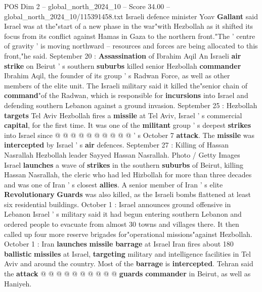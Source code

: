 \begin{textsample}{POS Dim 2 – global\_north\_2024\_10 – Score 34.00 – global\_north\_2024\_10/115391458.txt}
Israeli defence minister Yoav \textbf{Gallant} said Israel was at the"start of a new phase in the war"with Hezbollah as it shifted its focus from its conflict against Hamas in Gaza to the northern front."The ' centre of gravity ' is moving northward -- resources and forces are being allocated to this front,"he said.
September 20 : \textbf{Assassination} of Ibrahim Aqil An Israeli \textbf{air} \textbf{strike} on Beirut ' s southern \textbf{suburbs} killed senior Hezbollah \textbf{commander} Ibrahim Aqil, the founder of its group ' s Radwan Force, as well as other members of the elite unit.
The Israeli military said it killed the"senior chain of \textbf{command}"of the Radwan, which is responsible for \textbf{incursions} into Israel and defending southern Lebanon against a ground invasion.
September 25 : Hezbollah \textbf{targets} Tel Aviv Hezbollah fires a \textbf{missile} at Tel Aviv, Israel ' s commercial \textbf{capital}, for the first time.
It was one of the \textbf{militant} group ' s deepest \textbf{strikes} into Israel since @ @ @ @ @ @ @ @ @ @ ' s October 7 \textbf{attack}.
The \textbf{missile} was \textbf{intercepted} by Israel ' s \textbf{air} defences.
September 27 : Killing of Hassan Nasrallah Hezbollah leader Sayyed Hassan Nasrallah.
Photo / Getty Images Israel \textbf{launches} a wave of \textbf{strikes} in the southern \textbf{suburbs} of Beirut, killing Hassan Nasrallah, the cleric who had led Hizbollah for more than three decades and was one of Iran ' s closest \textbf{allies}.
A senior member of Iran ' s elite \textbf{Revolutionary} \textbf{Guards} was also killed, as the Israeli bombs flattened at least six residential buildings.
October 1 : Israel announces ground offensive in Lebanon Israel ' s military said it had begun entering southern Lebanon and ordered people to evacuate from almost 30 towns and villages there.
It then called up four more reserve brigades for"operational missions"against Hezbollah.
October 1 : Iran \textbf{launches} \textbf{missile} \textbf{barrage} at Israel Iran fires about 180 \textbf{ballistic} \textbf{missiles} at Israel, \textbf{targeting} military and intelligence facilities in Tel Aviv and around the country.
Most of the \textbf{barrage} is \textbf{intercepted}.
Tehran said the \textbf{attack} @ @ @ @ @ @ @ @ @ @ \textbf{guards} \textbf{commander} in Beirut, as well as Haniyeh.

\end{textsample}
